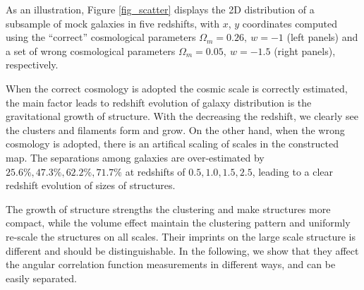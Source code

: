\documentclass[iop]{emulateapj}
\newcommand{\hMsun}{{\ifmmode{h^{-1}{\rm
        {M_{\odot}}}}\else{$h^{-1}{\rm{M_{\odot}}}$~}\fi}}
\begin{document}
As an illustration, Figure \ref{fig_scatter} displays the 2D distribution of a subsample of mock galaxies in five redshifts,
with $x$, $y$ coordinates computed using the ``correct'' cosmological parameters $\Omega_m=0.26,\ w=-1$ (left panels) 
and a set of wrong cosmological parameters $\Omega_m=0.05,\ w=-1.5$ (right panels), respectively.

When the correct cosmology is adopted the cosmic scale is correctly estimated,
the main factor leads to redshift evolution of galaxy distribution is the gravitational growth of structure.
With the decreasing the redshift, we clearly see the clusters and filaments form and grow.
On the other hand, when the wrong cosmology is adopted, there is an artifical scaling of scales in the constructed map.
The separations among galaxies are over-estimated by 
$25.6\%,47.3\%,62.2\%,71.7\%$ at redshifts of $0.5,1.0,1.5,2.5$,
leading to a clear redshift evolution of sizes of structures.

The growth of structure strengths the clustering and make structures more compact,
while the volume effect maintain the clustering pattern and uniformly re-scale the structures on all scales.
Their imprints on the large scale structure is different and should be distinguishable.
In the following, we show that they affect the angular correlation function measurements in different ways, 
and can be easily separated.





\end{document}
